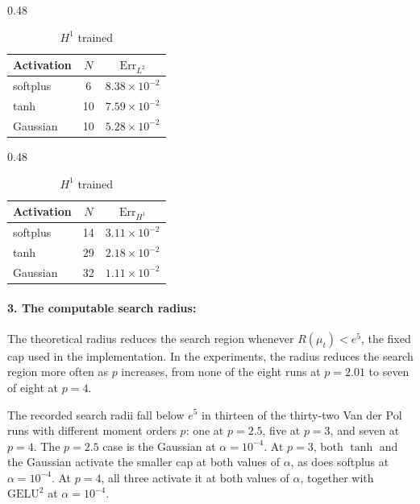 \documentclass[11pt]{amsart}
\theoremstyle{definition}
\theoremstyle{remark}
\begin{document}
\begin{table}[htbp]
\centering
\caption{Support size and validation error for the parameter values in
Table~\ref{tab:alg1_gradient}.}
\label{tab:alg1_sparsity}
\begin{subtable}{0.48\textwidth}
\centering
\setlength{\tabcolsep}{12pt}
\renewcommand{\arraystretch}{1.25}
\begin{tabular}{lcc}
\toprule
Activation & $N$ & $\mathrm{Err}_{L^2}$ \\
\midrule
softplus & 6 & $8.38 \times 10^{-2}$ \\
tanh & 10 & $7.59 \times 10^{-2}$ \\
Gaussian & 10 & $5.28 \times 10^{-2}$ \\
\bottomrule
\end{tabular}
\caption{$L^2$ trained}
\label{tab:alg1_sparsity_l2}
\end{subtable}
\hfill
\begin{subtable}{0.48\textwidth}
\centering
\setlength{\tabcolsep}{12pt}
\renewcommand{\arraystretch}{1.25}
\begin{tabular}{lcc}
\toprule
Activation & $N$ & $\mathrm{Err}_{H^1}$ \\
\midrule
softplus & 14 & $3.11 \times 10^{-2}$ \\
tanh & 29 & $2.18 \times 10^{-2}$ \\
Gaussian & 32 & $1.11 \times 10^{-2}$ \\
\bottomrule
\end{tabular}
\caption{$H^1$ trained}
\label{tab:alg1_sparsity_h1}
\end{subtable}
\end{table}

\paragraph{\textbf{3. The computable search radius:}}
The theoretical radius reduces the search region whenever $R(\mu_t)<e^5$,
the fixed cap used in the implementation. In the experiments, the radius reduces the search region more often as $p$
increases, from none of the eight runs at $p=2.01$ to seven of eight at $p=4$.

The recorded search radii fall below $e^5$ in thirteen of the
thirty-two Van der Pol runs with different moment orders $p$: one at $p=2.5$, five at $p=3$,
and seven at $p=4$. The $p=2.5$ case is the Gaussian at $\alpha=10^{-4}$.
At $p=3$, both $\tanh$ and the Gaussian activate the smaller cap at both
values of $\alpha$, as does softplus at $\alpha=10^{-4}$. At $p=4$, all
three activate it at both values of $\alpha$, together with
$\mathrm{GELU}^2$ at $\alpha=10^{-4}$.
\end{document}
